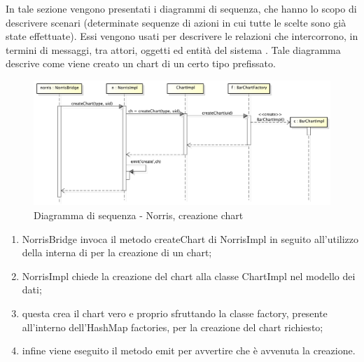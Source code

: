     	In tale sezione vengono presentati i diagrammi di sequenza, che hanno lo scopo di descrivere scenari (determinate sequenze di azioni in cui tutte le scelte sono già state effettuate). Essi vengono usati per descrivere le relazioni che intercorrono, in termini di messaggi, tra attori, oggetti ed entità del sistema .
        	Tale diagramma descrive come viene creato un chart di un certo tipo prefissato.
            \begin{figure}[H]
                \centering
                \includegraphics[scale=0.3]{DefinizioneDiProdotto/Pics/NorrisCreazioneChart}
                \caption{Diagramma di sequenza - Norris, creazione chart}
            \end{figure}
            \begin{enumerate}
                \item NorrisBridge invoca il metodo createChart di NorrisImpl in seguito all'utilizzo della  interna di  per la creazione di un chart;
                \item NorrisImpl chiede la creazione del chart alla classe ChartImpl nel modello dei dati;
                \item questa crea il chart vero e proprio sfruttando la classe factory, presente all'interno dell'HashMap factories, per la creazione del chart richiesto;
                \item infine viene eseguito il metodo emit per avvertire che è avvenuta la creazione.
            \end{enumerate}


